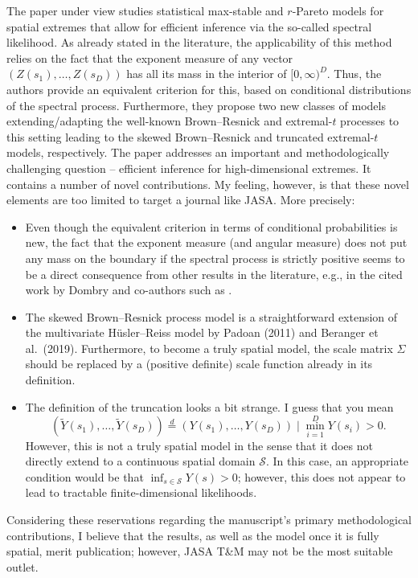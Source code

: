 \documentclass[12pt
]{article}
\begin{document}
\begin{Comments}
The paper under view studies statistical max-stable and $r$-Pareto models for spatial extremes that allow for efficient inference via the so-called spectral likelihood. As already stated in the literature, the applicability of this method relies on the fact that the exponent measure of any vector $(Z(s_1),\ldots,Z(s_D))$ has all its mass in the interior of $[0,\infty)^D$. Thus, the authors provide an equivalent criterion for this, based on conditional distributions of the spectral process. Furthermore, they propose two new classes of models extending/adapting the well-known Brown--Resnick and extremal-$t$ processes to this setting leading to the skewed Brown--Resnick and truncated extremal-$t$ models, respectively. The paper addresses an important and methodologically challenging question -- efficient inference for high-dimensional extremes. It contains a number of novel contributions. My feeling, however, is that these novel elements are too limited to target a journal like JASA. More precisely:
\begin{itemize}
  \item Even though the equivalent criterion in terms of conditional probabilities is new, the fact that the exponent measure (and angular measure) does not put any mass on the boundary if the spectral process is strictly positive seems to be a direct consequence from other results in the literature, e.g., in the cited work by Dombry and co-authors such as \citet{Dombry.Ribatet:2015}.
  \item The skewed Brown--Resnick process model is a straightforward extension of the multivariate H\"{u}sler--Reiss model by Padoan (2011) and Beranger et al.\ (2019). Furthermore, to become a truly spatial model, the scale matrix $\Sigma$ should be replaced by a (positive definite) scale function already in its definition.
  \item The definition of the truncation looks a bit strange. I guess that you mean
  \[
    (\tilde{Y}(s_1),\ldots,\tilde{Y}(s_D)) \stackrel{d}{=} (Y(s_1),\ldots,Y(s_D)) \mid \min_{i=1}^{D} Y(s_i) > 0.
  \]
  However, this is not a truly spatial model in the sense that it does not directly extend to a continuous spatial domain $\mathcal{S}$. In this case, an appropriate condition would be that $\inf_{s\in\mathcal{S}} Y(s)>0$; however, this does not appear to lead to tractable finite-dimensional likelihoods.
\end{itemize}
Considering these reservations regarding the manuscript's primary methodological contributions, I believe that the results, as well as the model once it is fully spatial, merit publication; however, JASA T\&M may not be the most suitable outlet.
\end{Comments}
\end{document}
